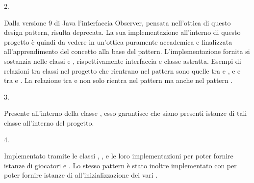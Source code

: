 \documentclass[letterpaper,10pt,italian,openany,oneside]{sphinxmanual}
\begin{document}
2.  %
\begin{footnote}[3]\sphinxAtStartFootnote
{}
%
\end{footnote}
Dalla versione 9 di Java l’interfaccia Observer, pensata nell’ottica di questo design pattern, risulta deprecata.
La sua implementazione all’interno di questo progetto è quindi da vedere in un’ottica puramente accademica e finalizzata all’apprendimento del concetto alla base del pattern.
L’implementazione fornita si sostanzia nelle classi  e , rispettivamente interfaccia e classe astratta.
Esempi di relazioni tra classi nel progetto che rientrano nel pattern  sono quelle tra   e ,  e  
e tra   e  .
La relazione tra  e  non solo rientra nel pattern  ma anche nel pattern .

3.  %
\begin{footnote}[4]\sphinxAtStartFootnote
{}
%
\end{footnote}
Presente all’interno della classe , esso garantisce che siano presenti  istanze di tali classe all’interno del progetto.

4.  %
\begin{footnote}[5]\sphinxAtStartFootnote
{}
%
\end{footnote}
Implementato tramite le classi , ,  e le loro implementazioni per poter fornire istanze di giocatori  e .
Lo stesso pattern è stato inoltre implementato con  per poter fornire istanze di  all’inizializzazione dei vari .
\end{document}
